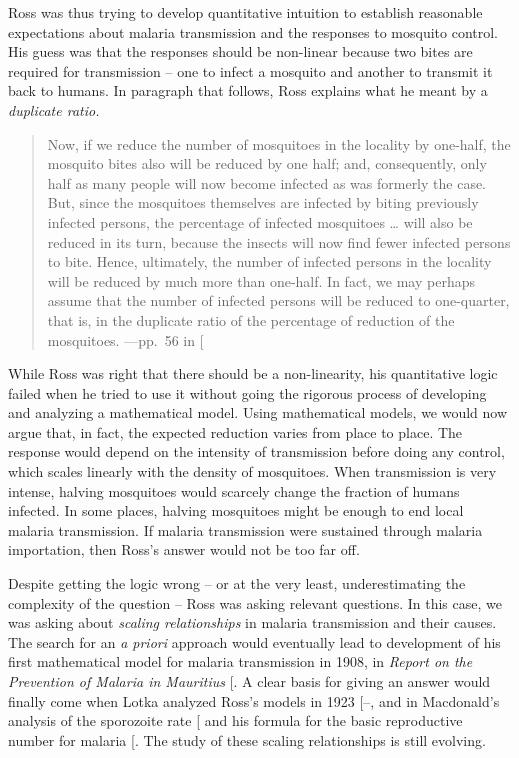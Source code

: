 \documentclass[
]{book}
\begin{document}
Ross was thus trying to develop quantitative intuition to establish reasonable expectations about malaria transmission and the responses to mosquito control. His guess was that the responses should be non-linear because two bites are required for transmission -- one to infect a mosquito and another to transmit it back to humans. In paragraph that follows, Ross explains what he meant by a \emph{duplicate ratio.}

\begin{quote}
Now, if we reduce the number of mosquitoes in the locality by one-half, the mosquito bites also will be reduced by one half; and, consequently, only half as many people will now become infected as was formerly the case. But, since the mosquitoes themselves are infected by biting previously infected persons, the percentage of infected mosquitoes \ldots{} will also be reduced in its turn, because the insects will now find fewer infected persons to bite. Hence, ultimately, the number of infected persons in the locality will be reduced by much more than one-half. In fact, we may perhaps assume that the number of infected persons will be reduced to one-quarter, that is, in the duplicate ratio of the percentage of reduction of the mosquitoes. ---pp.~56 in {[}\citeproc{ref-RossR1902MosquitoBrigades}{33}{]}
\end{quote}

While Ross was right that there should be a non-linearity, his quantitative logic failed when he tried to use it without going the rigorous process of developing and analyzing a mathematical model.
Using mathematical models, we would now argue that, in fact, the expected reduction varies from place to place.
The response would depend on the intensity of transmission before doing any control, which scales linearly with the density of mosquitoes.
When transmission is very intense, halving mosquitoes would scarcely change the fraction of humans infected.
In some places, halving mosquitoes might be enough to end local malaria transmission. If malaria transmission were sustained through malaria importation, then Ross's answer would not be too far off.

Despite getting the logic wrong -- or at the very least, underestimating the complexity of the question -- Ross was asking relevant questions.
In this case, we was asking about \emph{scaling relationships} in malaria transmission and their causes.
The search for an \emph{a priori} approach would eventually lead to development of his first mathematical model for malaria transmission in 1908, in \emph{Report on the Prevention of Malaria in Mauritius} {[}\citeproc{ref-RossR1908}{13}{]}. A clear basis for giving an answer would finally come when Lotka analyzed Ross's models in 1923 {[}--\citeproc{ref-LotkaAJ1923part5}{37}{]}, and in Macdonald's analysis of the sporozoite rate {[}\citeproc{ref-MacdonaldG1952Sporozoite}{38}{]} and his formula for the basic reproductive number for malaria {[}\citeproc{ref-MacdonaldG1952R0}{39}{]}. The study of these scaling relationships is still evolving.
\end{document}
